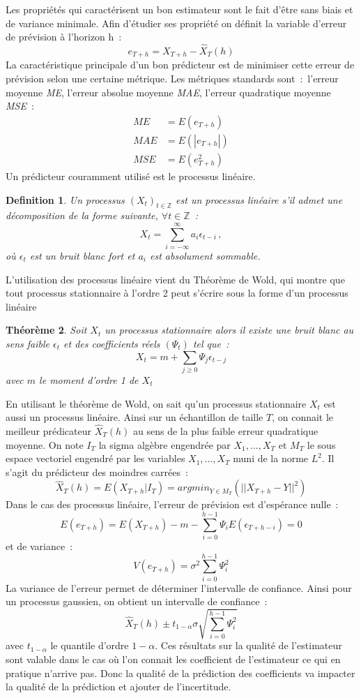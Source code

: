\documentclass[11pt]{scrartcl} %
\newtheorem{theorem}{Théorème}[section]
\newtheorem{Def}[theorem]{Definition}
\newcommand{\Xt}{\left(X_t\right)_{t\in\mathbb{Z}}}
\newcommand{\Z}{\mathbb{Z}}
\begin{document}
Les propriétés qui caractérisent un bon estimateur sont le fait d'être sans biais et de variance minimale. Afin d'étudier ses propriété on définit la variable d'erreur de prévision à l'horizon h~:
$$
e_{T+h} = X_{T+h}-\hat{X}_T(h)
$$
La caractéristique principale d'un bon prédicteur est de minimiser cette erreur de prévision selon une certaine métrique. Les métriques standards sont~:~l'erreur moyenne \textit{ME}, l'erreur absolue moyenne \textit{MAE}, l'erreur quadratique moyenne \textit{MSE}~:
\begin{align*}
ME&=E\left(e_{T+h}\right)\\
MAE&=E\left(\left|e_{T+h}\right|\right)\\
MSE&=E\left(e_{T+h}^2\right)
\end{align*}
Un prédicteur couramment utilisé est le processus linéaire. 
\begin{Def}
Un processus $\Xt$ est un processus linéaire s'il admet une décomposition de la forme suivante, $\forall t \in \Z$~:
$$
X_t = \sum_{i=-\infty}^{\infty}a_i\epsilon_{t-i}\,,
$$
où $\epsilon_t$ est un bruit blanc fort et $a_i$ est absolument sommable.
\end{Def}
L'utilisation des processus linéaire vient du Théorème de Wold, qui montre que tout processus stationnaire à l'ordre 2 peut s'écrire sous la forme d'un processus linéaire
\begin{theorem}\label{Wold}
Soit $X_t$ un processus stationnaire alors il existe une bruit blanc au sens faible $\epsilon_t$ et des coefficients réels $\left(\Psi_t\right)$ tel que~:
$$
X_t = m+\sum_{j\geq 0}\Psi_j\epsilon_{t-j}
$$
avec $m$ le moment d'ordre 1 de $X_t$
\end{theorem}
En utilisant le théorème de Wold, on sait qu'un processus stationnaire $X_t$ est aussi un processus linéaire. Ainsi sur un échantillon de taille $T$, on connait le meilleur prédicateur $\hat{X}_T(h)$ au sens de la plus faible erreur quadratique moyenne. On note $I_T$ la sigma algèbre engendrée par $X_1,...,X_T$ et $M_T$ le sous espace vectoriel engendré par les variables $X_1,...,X_T$ muni de la norme $L^2$. Il s'agit du prédicteur des moindres carrées~:
$$
\hat{X}_T(h)=E\left(X_{T+h}|I_T\right)=argmin_{Y\in M_T}\left(||X_{T+h}-Y||^2\right)
$$
Dans le cas des processus linéaire, l'erreur de prévision est d'espérance nulle~:
$$
E(e_{T+h}) = E(X_{T+h})-m-\sum_{i= 0}^{h-1}\Psi_iE(\epsilon_{T+h-i})=0
$$
et de variance~:
$$
V(e_{T+h}) = \sigma^2\sum_{i=0}^{h-1}\Psi_i^2
$$
La variance de l'erreur permet de déterminer l'intervalle de confiance. Ainsi pour un processus gaussien, on obtient un intervalle de confiance~:
$$
\hat{X}_T(h)\pm t_{1-\alpha}\sigma\sqrt{\sum_{i=0}^{h-1}\Psi_i^2}
$$
avec $t_{1-\alpha}$ le quantile d'ordre $1-\alpha$. Ces résultats sur la qualité de l'estimateur sont valable dans le cas où l'on connait les coefficient de l'estimateur ce qui en pratique n'arrive pas. Donc la qualité de la prédiction des coefficients va impacter la qualité de la prédiction et ajouter de l'incertitude.
\end{document}
